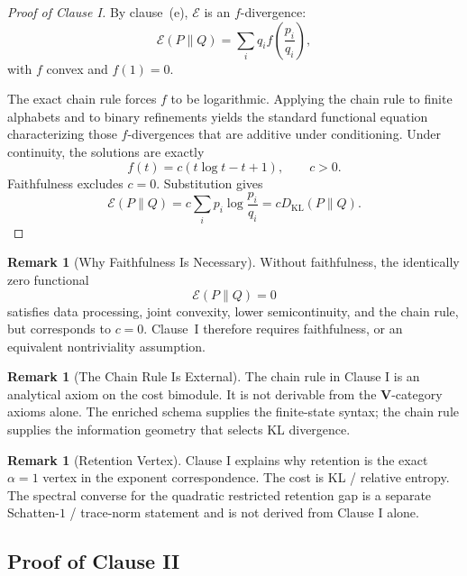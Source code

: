 \documentclass[12pt]{article}
\theoremstyle{definition}
\newtheorem{remark}[theorem]{Remark}
\begin{document}
\begin{proof}[Proof of Clause I]
By clause~(e), $\mathcal E$ is an $f$-divergence:
\[
\mathcal E(P\|Q)
=
\sum_i q_i f\!\left(\frac{p_i}{q_i}\right),
\]
with $f$ convex and $f(1)=0$.

The exact chain rule forces $f$ to be logarithmic.  Applying the chain rule
to finite alphabets and to binary refinements yields the standard functional
equation characterizing those $f$-divergences that are additive under
conditioning.  Under continuity, the solutions are exactly
\[
f(t)=c(t\log t-t+1),
\qquad c>0.
\]
Faithfulness excludes $c=0$.  Substitution gives
\[
\mathcal E(P\|Q)
=
c
\sum_i p_i\log\frac{p_i}{q_i}
=
cD_{\mathrm{KL}}(P\|Q).
\]
\end{proof}

\begin{remark}[Why Faithfulness Is Necessary]
\label{rem:clauseI-faithfulness}
Without faithfulness, the identically zero functional
\[
\mathcal E(P\|Q)=0
\]
satisfies data processing, joint convexity, lower semicontinuity, and the
chain rule, but corresponds to $c=0$.  Clause~I therefore requires
faithfulness, or an equivalent nontriviality assumption.
\end{remark}

\begin{remark}[The Chain Rule Is External]
\label{rem:chain-rule-external}
The chain rule in Clause I is an analytical axiom on the cost bimodule.  It is
not derivable from the $\mathbf V$-category axioms alone.  The enriched schema
supplies the finite-state syntax; the chain rule supplies the information
geometry that selects KL divergence.
\end{remark}

\begin{remark}[Retention Vertex]
\label{rem:clauseI-retention-vertex}
Clause I explains why retention is the exact $\alpha=1$ vertex in the exponent
correspondence.  The cost is KL / relative entropy.  The spectral converse for
the quadratic restricted retention gap is a separate Schatten-$1$ /
trace-norm statement and is not derived from Clause I alone.
\end{remark}

\subsection{Proof of Clause II}
\label{subsec:proof-clause-II}
\end{document}
